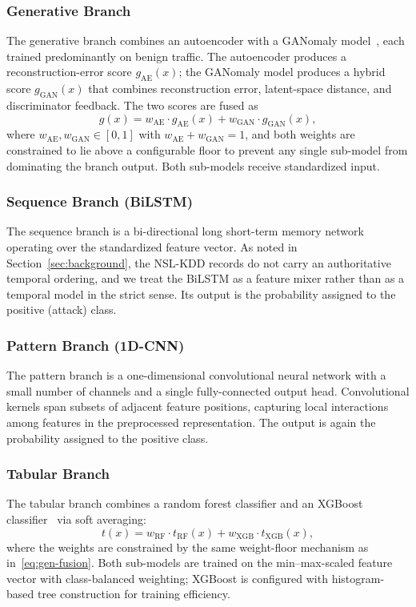 \documentclass[pdflatex,sn-mathphys-num]{sn-jnl}
\theoremstyle{thmstyleone}
\theoremstyle{thmstyletwo}
\theoremstyle{thmstylethree}
\begin{document}
\subsubsection{Generative Branch}
The generative branch combines an autoencoder with a GANomaly model~\cite{akcay2019ganomaly}, each trained predominantly on benign traffic. The autoencoder produces a reconstruction-error score $g_{\mathrm{AE}}(x)$; the GANomaly model produces a hybrid score $g_{\mathrm{GAN}}(x)$ that combines reconstruction error, latent-space distance, and discriminator feedback. The two scores are fused as
\begin{equation}
\label{eq:gen-fusion}
g(x) = w_{\mathrm{AE}} \cdot g_{\mathrm{AE}}(x) + w_{\mathrm{GAN}} \cdot g_{\mathrm{GAN}}(x),
\end{equation}
where $w_{\mathrm{AE}}, w_{\mathrm{GAN}} \in [0,1]$ with $w_{\mathrm{AE}} + w_{\mathrm{GAN}} = 1$, and both weights are constrained to lie above a configurable floor to prevent any single sub-model from dominating the branch output. Both sub-models receive standardized input.

\subsubsection{Sequence Branch (BiLSTM)}
The sequence branch is a bi-directional long short-term memory network operating over the standardized feature vector. As noted in Section~\ref{sec:background}, the NSL-KDD records do not carry an authoritative temporal ordering, and we treat the BiLSTM as a feature mixer rather than as a temporal model in the strict sense. Its output is the probability assigned to the positive (attack) class.

\subsubsection{Pattern Branch (1D-CNN)}
The pattern branch is a one-dimensional convolutional neural network with a small number of channels and a single fully-connected output head. Convolutional kernels span subsets of adjacent feature positions, capturing local interactions among features in the preprocessed representation. The output is again the probability assigned to the positive class.

\subsubsection{Tabular Branch}
The tabular branch combines a random forest classifier and an XGBoost classifier~\cite{chen2016xgboost} via soft averaging:
\begin{equation}
\label{eq:tab-fusion}
t(x) = w_{\mathrm{RF}} \cdot t_{\mathrm{RF}}(x) + w_{\mathrm{XGB}} \cdot t_{\mathrm{XGB}}(x),
\end{equation}
where the weights are constrained by the same weight-floor mechanism as in~\eqref{eq:gen-fusion}. Both sub-models are trained on the min--max-scaled feature vector with class-balanced weighting; XGBoost is configured with histogram-based tree construction for training efficiency.
\end{document}
